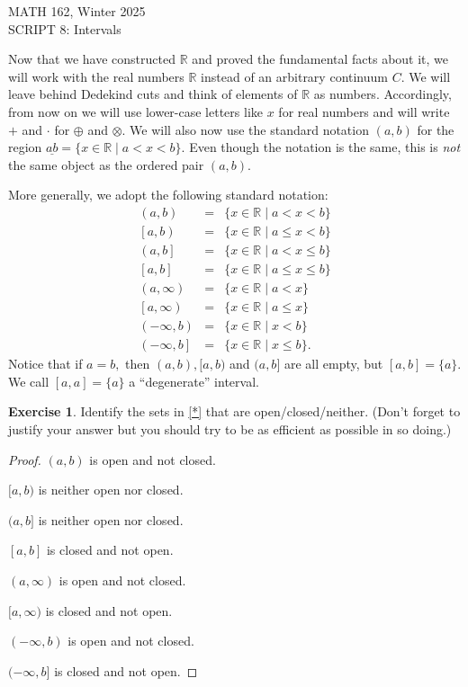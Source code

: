 \documentclass[11pt]{article}
\newcommand{\bbR}{\mathbb{R}}
\theoremstyle{definition}
\newtheorem{exercise}[theorem]{Exercise}
\newcommand{\head}[1]{
	\begin{center}
		{\large #1}
		\vspace{.2 in}
	\end{center}
	
	\bigskip
}
\numberwithin{equation}{section}
\begin{document}
\head{MATH 162, Winter 2025\\
SCRIPT 8: Intervals} 



\setcounter{section}{8}   

Now that we have constructed $\bbR$ and proved the fundamental facts about it, we will  work with the real numbers $\bbR$ instead of an arbitrary continuum $C$. We will leave behind Dedekind cuts and think of elements of $\bbR$ as numbers. Accordingly,  from now on we will use lower-case letters like $x$ for real numbers and will write $+$ and $\cdot$ for $\oplus$ and $\otimes$. We will also now use the standard notation $(a, b)$ for the region $\underline{ab} = \{x \in \bbR \mid a < x < b\}$. Even though the notation is the same, this is \emph{not} the same object as the ordered pair $(a, b)$.

More generally, we adopt the following standard notation:
\begin{eqnarray}
(a, b) & = & \{x\in \bbR\mid a<x<b\} \nonumber \\
\left[a,b\right)  & = & \{x\in \bbR\mid a\leq x<b\} \nonumber\\
\left(a,b\right] & =& \{x\in \bbR\mid a<x\leq b\}  \nonumber  \\
\left[a,b\right] & =& \{x\in \bbR\mid a\leq x\leq b\}  \label{*}\\
\left(a,\infty\right) & =& \{x\in \bbR\mid a<x\} \nonumber  \\
\left[a,\infty\right) & =& \{x\in \bbR\mid a\leq x\} \nonumber  \\
\left(-\infty,b\right) & =& \{x\in \bbR\mid x<b\} \nonumber  \\
\left(-\infty, b\right] & = & \{x\in \bbR\mid x\leq b\} \nonumber .
\end{eqnarray}
Notice that if $a=b,$ then $(a,b), [a,b)$ and $(a,b]$ are all empty, but $[a,b]=\{a\}.$ We call $[a,a]=\{a\}$ a ``degenerate'' interval. 

\begin{exercise} Identify the sets in \eqref{*} that are open/closed/neither. (Don't forget to justify your answer but you should try to be as efficient as possible in so doing.)


\begin{proof}
$(a,b)$ is open and not closed.

$[a,b)$ is neither open nor closed.

$(a,b]$ is neither open nor closed.

$[a,b]$ is closed and not open.

$(a,\infty)$ is open and not closed.

$[a, \infty)$ is closed and not open.

$(-\infty,b)$ is open and not closed.

$(-\infty, b]$ is closed and not open.


\renewcommand\qedsymbol{QED}
\end{proof}


\end{exercise}
\end{document}
